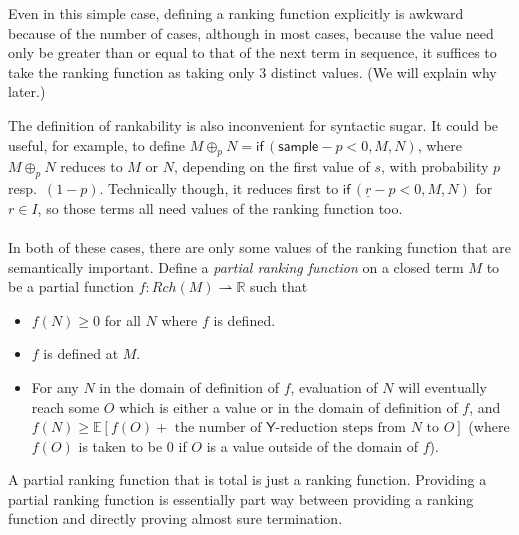 \documentclass{article}
\newcommand{\tY}{\textsf{Y}}
\newcommand{\tif}[3]{\textsf{if}\,(#1, #2, #3)} %
\newcommand{\tsample}{\textsf{sample}}
\theoremstyle{definition}
\theoremstyle{lemma}
\theoremstyle{remark}
\begin{document}
Even in this simple case, defining a ranking function explicitly is awkward because of the number of cases, although in most cases, because the value need only be greater than or equal to that of the next term in sequence, it suffices to take the ranking function as taking only 3 distinct values.
(We will explain why later.)

The definition of rankability is also inconvenient for syntactic sugar. It could be useful, for example, to define $M \oplus_p N = \tif{\tsample - p < 0} M N$, where $M \oplus_p N$ reduces to $M$ or $N$, depending on the first value of $s$, with probability $p$ resp.~$(1-p)$. Technically though, it reduces first to $\tif{\underline r - p < 0} M N$ for $r \in I$, so those terms all need values of the ranking function too.

\paragraph{}
In both of these cases, there are only some values of the ranking function that are semantically important. Define a \emph{partial ranking function} on a closed term $M$ to be a partial function $f : Rch(M) \rightharpoonup \mathbb R$ such that
\begin{itemize}
    \item $f(N) \geq 0$ for all $N$ where $f$ is defined.
    \item $f$ is defined at $M$.
    \item For any $N$ in the domain of definition of $f$, evaluation of $N$ will eventually  reach some $O$ which is either a value or in the domain of definition of $f$, and $f(N) \geq \mathbb E[f(O) + \text{ the number of $\tY$-reduction steps from $N$ to $O$}]$ (where $f(O)$ is taken to be 0 if $O$ is a value outside of the domain of $f$).
\end{itemize}
A partial ranking function that is total is just a ranking function. Providing a partial ranking function is essentially part way between providing a ranking function and directly proving almost sure termination.
\end{document}
